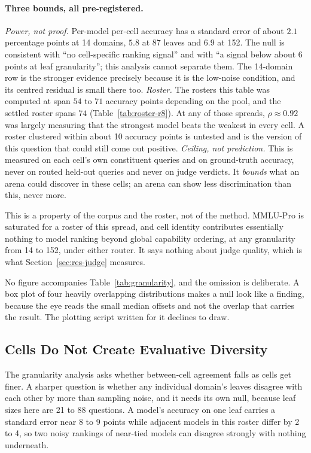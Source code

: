 \paragraph{Three bounds, all pre-registered.}
\emph{Power, not proof.} Per-model per-cell accuracy has a standard
error of about $2.1$ percentage points at 14 domains, $5.8$ at 87
leaves and $6.9$ at 152. The null is consistent with ``no cell-specific
ranking signal'' and with ``a signal below about 6 points at leaf
granularity''; this analysis cannot separate them. The 14-domain row is
the stronger evidence precisely because it is the low-noise condition,
and its centred residual is small there too.
\emph{Roster.} The rosters this table was computed at span $54$ to
$71$ accuracy points depending on the pool, and the settled roster
spans $74$ (Table~\ref{tab:roster-r8}). At any of those spreads,
$\rho \approx 0.92$ was largely measuring that the strongest model beats
the weakest in every cell. A roster clustered within about 10 accuracy
points is untested and is the version of this question that could still
come out positive.
\emph{Ceiling, not prediction.} This is measured on each cell's own
constituent queries and on ground-truth accuracy, never on routed
held-out queries and never on judge verdicts. It \emph{bounds} what an
arena could discover in these cells; an arena can show less
discrimination than this, never more.

This is a property of the corpus and the roster, not
of the method. MMLU-Pro is saturated for a roster of this spread, and
cell identity contributes essentially nothing to model ranking beyond
global capability ordering, at any granularity from 14 to 152, under
either router. It says nothing about judge quality, which is what
Section~\ref{sec:res-judge} measures.

No figure accompanies Table~\ref{tab:granularity}, and the omission is
deliberate. A box plot of four heavily overlapping distributions makes
a null look like a finding, because the eye reads the small median
offsets and not the overlap that carries the result. The plotting
script written for it declines to draw.

\subsection{Cells Do Not Create Evaluative Diversity}\label{sec:res-leaf-null}

The granularity analysis asks whether between-cell agreement falls as
cells get finer. A sharper question is whether any individual domain's
leaves disagree with each other by more than sampling noise, and it
needs its own null, because leaf sizes here are 21 to 88 questions. A
model's accuracy on one leaf carries a standard error near 8 to 9
points while adjacent models in this roster differ by 2 to 4, so two
noisy rankings of near-tied models can disagree strongly with nothing
underneath.

